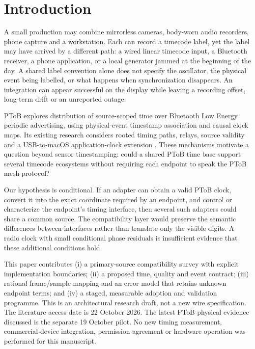 \documentclass[11pt,letterpaper]{article}
\begin{document}
\section{Introduction}
A small production may combine mirrorless cameras, body-worn audio recorders, phone capture and a workstation. Each can record a timecode label, yet the label may have arrived by a different path: a wired linear timecode input, a Bluetooth receiver, a phone application, or a local generator jammed at the beginning of the day. A shared label convention alone does not specify the oscillator, the physical event being labelled, or what happens when synchronization disappears. An integration can appear successful on the display while leaving a recording offset, long-term drift or an unreported outage.

PToB explores distribution of source-scoped time over Bluetooth Low Energy periodic advertising, using physical-event timestamp association and causal clock maps. Its existing research considers rooted timing paths, relays, source validity and a USB-to-macOS application-clock extension \cite{viability,usb}. These mechanisms motivate a question beyond sensor timestamping: could a shared PToB time base support several timecode ecosystems without requiring each endpoint to speak the PToB mesh protocol?

Our hypothesis is conditional. If an adapter can obtain a valid PToB clock, convert it into the exact coordinate required by an endpoint, and control or characterize the endpoint's timing interface, then several such adapters could share a common source. The compatibility layer would preserve the semantic differences between interfaces rather than translate only the visible digits. A radio clock with small conditional phase residuals is insufficient evidence that these additional conditions hold.

This paper contributes (i) a primary-source compatibility survey with explicit implementation boundaries; (ii) a proposed time, quality and event contract; (iii) rational frame/sample mapping and an error model that retains unknown endpoint terms; and (iv) a staged, measurable adoption and validation programme. This is an architectural research draft, not a new wire specification. The literature access date is 22 October 2026. The latest PToB physical evidence discussed is the separate 19 October pilot. No new timing measurement, commercial-device integration, permission agreement or hardware operation was performed for this manuscript.
\end{document}
